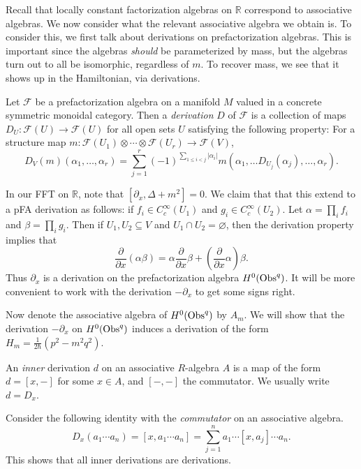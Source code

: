Recall that locally constant factorization algebras on $\mathbb{R} $ correspond to associative algebras. We now consider what the relevant associative algebra we obtain is. To consider this, we first talk about derivations on prefactorization algebras. This is important since the algebras \emph{should} be parameterized by mass, but the algebras turn out to all be isomorphic, regardless of $m$. To recover mass, we see that it shows up in the Hamiltonian, via derivations.

\begin{definition}\label{dfn:5.0.3}
	Let $\mathcal{F} $ be a prefactorization algebra on a manifold $M$ valued in a concrete symmetric monoidal category. Then a \emph{derivation} $D$ of $\mathcal{F} $ is a collection of maps $D_U : \mathcal{F}(U)  \to \mathcal{F}(U) $ for all open sets $U$ satisfying the following property: For a structure map $m : \mathcal{F} (U_1) \otimes \cdots \otimes \mathcal{F} (U_r) \to \mathcal{F} (V)$,
			\[
				D_V(m)(\alpha _1, \ldots ,\alpha _r) = \sum_{j=1}^{r} (-1)^{\sum_{1\leq i<j } \left| \alpha _i \right| } m\left( \alpha _1, \ldots D_{U_j} (\alpha _j), \ldots ,\alpha _r \right) 
			.\]
\end{definition}
In our FFT on $\mathbb{R} $, note that $[\partial _x, \Delta +m^2]=0$. We claim that that this extend to a pFA derivation as follows: if $f_i\in C^\infty_c(U_1)$ and $g_i\in C^\infty _c(U_2)$. Let $\alpha =\prod_{i} f_i$ and $\beta = \prod_{i} g_i$. Then if $U_1, U_2 \subseteq V$ and $U_1 \cap U_2=\varnothing $, then the derivation property implies that
\[
	\frac{\partial }{\partial x} (\alpha \beta ) = \alpha \frac{\partial }{\partial x} \beta + \left( \frac{\partial }{\partial x} \alpha  \right) \beta 
.\]
Thus $\partial _x$ is a derivation on the prefactorization algebra $H^0(\operatorname{Obs}^q)$. It will be more convenient to work with the derivation $-\partial _x$ to get some signs right.

Now denote the associative algebra of $H^0(\operatorname{Obs}^q)$ by $A_m$. We will show that the derivation $-\partial _x$ on $H^0(\operatorname{Obs}^q)$ induces a derivation of the form $H_m = \frac{1}{2\hbar }( p^2 -m^2q^2)$.
\begin{terminology}\label{5.0.4}
	An \emph{inner} derivation $d$ on an associative $R$-algebra $A$ is a map of the form $d=[x,-]$ for some $x\in A$, and $[-,-]$ the commutator. We usually write $d=D_x$.
\end{terminology}

Consider the following identity with the \emph{commutator} on an associative algebra.
\[
	D_x(a_1 \cdots a_n) = [x,a_1 \cdots a_n] = \sum_{j=1}^{n} a_1 \cdots [x,a_j] \cdots a_n
.\]
This shows that all inner derivations are derivations.


